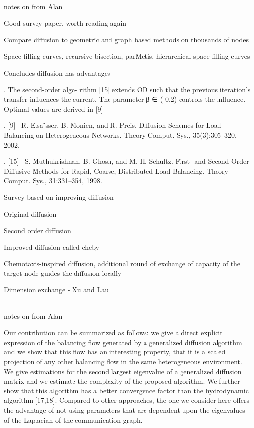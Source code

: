 \documentclass{article}
\begin{document}
\cite{Lieber:2016:PDL:2966884.2966887}\\


notes on
\cite{Lieber:2016:PDL:2966884.2966887}
from Alan


Good survey paper, worth reading again

Compare diffusion to geometric and graph based methods on thousands of nodes

Space filling curves, recursive bisection, parMetis, hierarchical space filling curves

Concludes diffusion has advantages

	.	The second-order algo- rithm [15] extends OD such that the previous iteration’s transfer influences the current. The parameter β ∈ ( 0,2) controls the influence. Optimal values are derived in [9] 

	.	[9]  R. Elsa ̈sser, B. Monien, and R. Preis. Diffusion Schemes for Load Balancing on Heterogeneous Networks. Theory Comput. Sys., 35(3):305–320, 2002. 

	.	[15]  S. Muthukrishnan, B. Ghosh, and M. H. Schultz. First  and Second Order Diffusive Methods for Rapid, Coarse, Distributed Load Balancing. Theory Comput. Sys., 31:331–354, 1998. 

Survey based on improving diffusion

Original diffusion

Second order diffusion

Improved diffusion called cheby

Chemotaxis-inspired diffusion, additional round of exchange of capacity of the target node guides the diffusion locally

Dimension exchange - Xu and Lau

\cite{ROTARU2004481}\\

notes on
\cite{ROTARU2004481}
from Alan


Our contribution  can be summarized as follows: we give a direct explicit expression of the balancing flow generated by a generalized diffusion algorithm and we show that this flow has an interesting property, that it is a scaled projection of any other balancing flow in the same heterogeneous environment. We give estimations for the second largest eigenvalue of a generalized diffusion matrix and we estimate the complexity of the proposed algorithm.  We further show that this algorithm has a better convergence factor than the hydrodynamic algorithm [17,18]. Compared to other approaches, the one we consider here offers the advantage of not using parameters that are dependent upon the eigenvalues of the Laplacian of the communication graph. 
\end{document}
